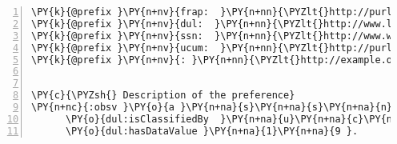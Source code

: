 \expandafter\def\csname PY@tok@err\endcsname{}
\begin{Verbatim}[commandchars=\\\{\},numbers=left,firstnumber=1,stepnumber=1]
\PY{k}{@prefix }\PY{n+nv}{frap:  }\PY{n+nn}{\PYZlt{}http://purl.org/frap/\PYZgt{} .}
\PY{k}{@prefix }\PY{n+nv}{dul:  }\PY{n+nn}{\PYZlt{}http://www.loa.istc.cnr.it/ontologies/DUL.owl\PYZsh{}\PYZgt{} .}
\PY{k}{@prefix }\PY{n+nv}{ssn:  }\PY{n+nn}{\PYZlt{}http://www.w3.org/2005/Incubator/ssn/ssnx/ssn\PYZsh{}\PYZgt{} .}
\PY{k}{@prefix }\PY{n+nv}{ucum:  }\PY{n+nn}{\PYZlt{}http://purl.oclc.org/NET/muo/ucum/\PYZgt{} .}
\PY{k}{@prefix }\PY{n+nv}{: }\PY{n+nn}{\PYZlt{}http://example.org/lamp/\PYZgt{}.}


\PY{c}{\PYZsh{} Description of the preference}
\PY{n+nc}{:obsv }\PY{o}{a }\PY{n+na}{s}\PY{n+na}{s}\PY{n+na}{n}\PY{n+na}{:}\PY{n+na}{O}\PY{n+na}{b}\PY{n+na}{s}\PY{n+na}{e}\PY{n+na}{r}\PY{n+na}{v}\PY{n+na}{a}\PY{n+na}{t}\PY{n+na}{i}\PY{n+na}{o}\PY{n+na}{n}\PY{n+na}{V}\PY{n+na}{a}\PY{n+na}{l}\PY{n+na}{u}\PY{n+na}{e}\PY{err}{,}\PY{n+na}{ f}\PY{n+na}{r}\PY{n+na}{a}\PY{n+na}{p}\PY{n+na}{:}\PY{n+na}{P}\PY{n+na}{r}\PY{n+na}{e}\PY{n+na}{f}\PY{n+na}{e}\PY{n+na}{r}\PY{n+na}{e}\PY{n+na}{n}\PY{n+na}{c}\PY{n+na}{e };
      \PY{o}{dul:isClassifiedBy  }\PY{n+na}{u}\PY{n+na}{c}\PY{n+na}{u}\PY{n+na}{m}\PY{n+na}{:}\PY{n+na}{l}\PY{n+na}{u}\PY{n+na}{x };
      \PY{o}{dul:hasDataValue }\PY{n+na}{1}\PY{n+na}{9 }. 
\end{Verbatim}
